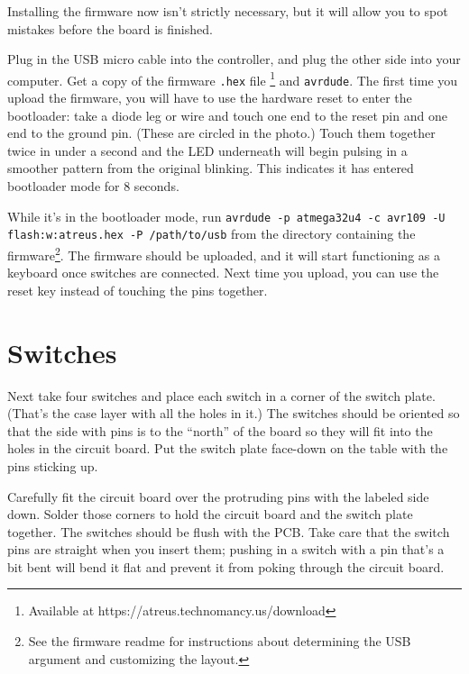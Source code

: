 \documentclass[landscape,twocolumn]{article}
\begin{document}
Installing the firmware now isn't strictly necessary, but it will
allow you to spot mistakes before the board is finished.

\vspace{1em}

Plug in the USB micro cable into the controller, and plug the other
side into your computer. Get a copy of the
firmware \texttt{.hex} file \footnote{Available at
  https://atreus.technomancy.us/download} and \texttt{avrdude}. The
first time you upload the firmware, you will have to use the hardware
reset to enter the bootloader: take a diode leg or wire and touch one
end to the reset pin and one end to the ground pin. (These are circled
in the photo.)  Touch them together twice in under a second and the
LED underneath will begin pulsing in a smoother pattern from the
original blinking. This indicates it has entered bootloader mode for 8
seconds.

\vspace{1em}

While it's in the bootloader mode, run \texttt{avrdude -p atmega32u4
  -c avr109 -U flash:w:atreus.hex -P /path/to/usb} from the directory
containing the firmware\footnote{See the firmware readme for
  instructions about determining the USB argument and customizing the
  layout.}. The firmware should be uploaded, and it will start
functioning as a keyboard once switches are connected. Next time you
upload, you can use the reset key instead of touching the pins
together.

\section{Switches}

Next take four switches and place each switch in a corner of the
switch plate. (That's the case layer with all the holes in it.) The
switches should be oriented so that the side with pins is to the
``north'' of the board so they will fit into the holes in the circuit
board. Put the switch plate face-down on the table with the pins
sticking up.

\vspace{1em}

Carefully fit the circuit board over the protruding pins with the
labeled side down. Solder those corners to hold the circuit board and
the switch plate together. The switches should be flush with the
PCB. Take care that the switch pins are straight when you insert them;
pushing in a switch with a pin that's a bit bent will bend it flat and
prevent it from poking through the circuit board.
\end{document}
